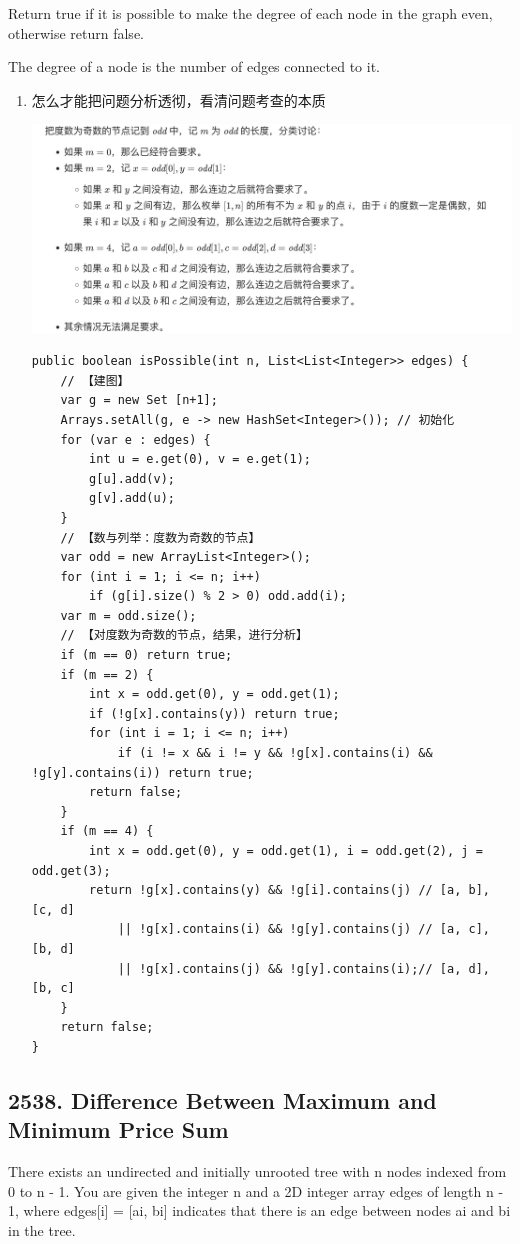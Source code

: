 \documentclass[9pt, b5paaper]{book}
\begin{document}
Return true if it is possible to make the degree of each node in the graph even, otherwise return false.

The degree of a node is the number of edges connected to it.
\begin{enumerate}
\item 怎么才能把问题分析透彻，看清问题考查的本质
\label{sec-1-4-1-1}

\includegraphics[width=.9\linewidth]{./pic/graph_20230412_083249.png}
\begin{verbatim}
public boolean isPossible(int n, List<List<Integer>> edges) {
    // 【建图】
    var g = new Set [n+1];
    Arrays.setAll(g, e -> new HashSet<Integer>()); // 初始化
    for (var e : edges) {
        int u = e.get(0), v = e.get(1);
        g[u].add(v);
        g[v].add(u);
    }
    // 【数与列举：度数为奇数的节点】
    var odd = new ArrayList<Integer>();
    for (int i = 1; i <= n; i++) 
        if (g[i].size() % 2 > 0) odd.add(i);
    var m = odd.size();
    // 【对度数为奇数的节点，结果，进行分析】
    if (m == 0) return true;
    if (m == 2) {
        int x = odd.get(0), y = odd.get(1);
        if (!g[x].contains(y)) return true;
        for (int i = 1; i <= n; i++) 
            if (i != x && i != y && !g[x].contains(i) && !g[y].contains(i)) return true;
        return false;
    }
    if (m == 4) {
        int x = odd.get(0), y = odd.get(1), i = odd.get(2), j = odd.get(3);
        return !g[x].contains(y) && !g[i].contains(j) // [a, b], [c, d]
            || !g[x].contains(i) && !g[y].contains(j) // [a, c], [b, d]
            || !g[x].contains(j) && !g[y].contains(i);// [a, d], [b, c]
    }
    return false;
}
\end{verbatim}
\end{enumerate}
\subsection{2538. Difference Between Maximum and Minimum Price Sum}
\label{sec-1-4-2}
There exists an undirected and initially unrooted tree with n nodes indexed from 0 to n - 1. You are given the integer n and a 2D integer array edges of length n - 1, where edges[i] = [ai, bi] indicates that there is an edge between nodes ai and bi in the tree.
\end{document}
